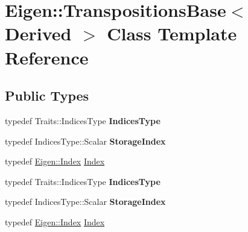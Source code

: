 \hypertarget{class_eigen_1_1_transpositions_base}{}\section{Eigen\+:\+:Transpositions\+Base$<$ Derived $>$ Class Template Reference}
\label{class_eigen_1_1_transpositions_base}
\subsection*{Public Types}
\begin{DoxyCompactItemize}
\item 
\mbox{\label{class_eigen_1_1_transpositions_base_a9e7d155e0921e39a201a1da9bca1894d}} 
typedef Traits\+::\+Indices\+Type {\bfseries Indices\+Type}
\item 
\mbox{\label{class_eigen_1_1_transpositions_base_a82d8ab18b21c00a1c0fcf8448c8f63c1}} 
typedef Indices\+Type\+::\+Scalar {\bfseries Storage\+Index}
\item 
typedef \hyperlink{namespace_eigen_a62e77e0933482dafde8fe197d9a2cfde}{Eigen\+::\+Index} \hyperlink{class_eigen_1_1_transpositions_base_a3f5f06118b419e8e6ccbe49ed5b4c91f}{Index}
\item 
\mbox{\label{class_eigen_1_1_transpositions_base_a9e7d155e0921e39a201a1da9bca1894d}} 
typedef Traits\+::\+Indices\+Type {\bfseries Indices\+Type}
\item 
\mbox{\label{class_eigen_1_1_transpositions_base_a82d8ab18b21c00a1c0fcf8448c8f63c1}} 
typedef Indices\+Type\+::\+Scalar {\bfseries Storage\+Index}
\item 
typedef \hyperlink{namespace_eigen_a62e77e0933482dafde8fe197d9a2cfde}{Eigen\+::\+Index} \hyperlink{class_eigen_1_1_transpositions_base_a3f5f06118b419e8e6ccbe49ed5b4c91f}{Index}
\end{DoxyCompactItemize}
